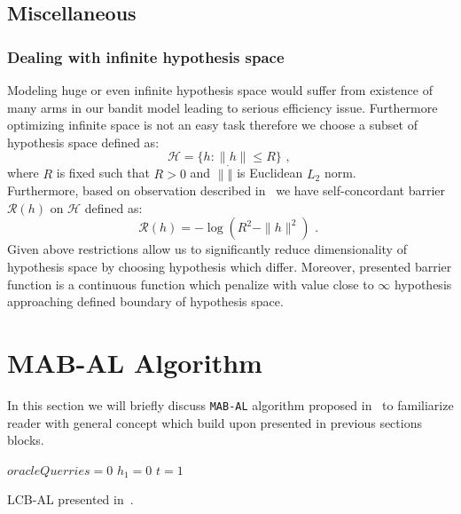 \documentclass[12pt, a4paper, pdflatex]{report}
\begin{document}
\subsection{Miscellaneous}
\subsubsection{Dealing with infinite hypothesis space}
Modeling huge or even infinite hypothesis space would suffer from existence of many arms in our bandit model leading to serious efficiency issue. Furthermore optimizing infinite space is not an easy task therefore we choose a subset of hypothesis space defined as:
$$
\mathscr{H} = \{ h : \|h\| \leq R \} \text{~,~}
$$
where $R$ is fixed such that $R > 0$ and $\| \dot \|$ is Euclidean $L_2$ norm.\\
Furthermore, based on observation described in~\cite{Abernethy08competingin} we have self-concordant barrier $\mathscr{R}(h)$ on $\mathscr{H}$ defined as:
$$
\mathscr{R}(h) = - \log(R^2 - \|h\|^2) \text{~.~}
$$
Given above restrictions allow us to significantly reduce dimensionality of hypothesis space by choosing hypothesis which differ. Moreover, presented barrier function is a continuous function which penalize with value close to $\infty$ hypothesis approaching defined boundary of hypothesis space.\\


\section{MAB-AL Algorithm}

In this section we will briefly discuss \texttt{MAB-AL} algorithm proposed in~\cite{DBLP:journals/corr/GantiG13} to familiarize reader with general concept which build upon presented in previous sections blocks.\\

\begin{algorithm}[H]
 \LinesNumbered
 $oracleQuerries = 0$\;
 $h_1 = 0$\;
 $t = 1$\;
 \caption{LCB-AL presented in~\cite{DBLP:journals/corr/GantiG13}.\label{LCB-AL}}
\end{algorithm}
\end{document}

